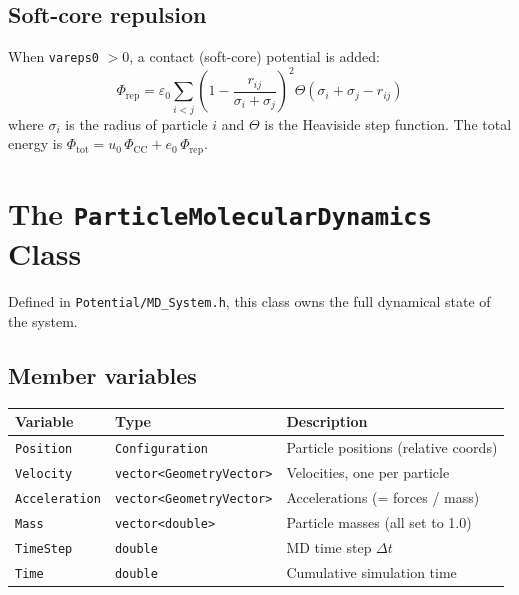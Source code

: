 \documentclass[12pt,a4paper]{article}
\begin{document}
\subsection{Soft-core repulsion}

When \texttt{vareps0} $> 0$, a contact (soft-core) potential is added:
\begin{equation}
    \Phi_\text{rep} = \varepsilon_0 \sum_{i<j}
    \left(1 - \frac{r_{ij}}{\sigma_i + \sigma_j}\right)^2
    \Theta(\sigma_i + \sigma_j - r_{ij})
\end{equation}
where $\sigma_i$ is the radius of particle $i$ and $\Theta$ is the
Heaviside step function.
The total energy is $\Phi_\text{tot} = u_0\,\Phi_\text{CC} + e_0\,\Phi_\text{rep}$.

\section{The \texttt{ParticleMolecularDynamics} Class}

Defined in \texttt{Potential/MD\_System.h}, this class owns the full
dynamical state of the system.

\subsection{Member variables}

\begin{center}
\begin{tabular}{lll}
\toprule
Variable & Type & Description \\
\midrule
\texttt{Position} & \texttt{Configuration} & Particle positions (relative coords) \\
\texttt{Velocity} & \texttt{vector<GeometryVector>} & Velocities, one per particle \\
\texttt{Acceleration} & \texttt{vector<GeometryVector>} & Accelerations (= forces / mass) \\
\texttt{Mass} & \texttt{vector<double>} & Particle masses (all set to 1.0) \\
\texttt{TimeStep} & \texttt{double} & MD time step $\Delta t$ \\
\texttt{Time} & \texttt{double} & Cumulative simulation time \\
\bottomrule
\end{tabular}
\end{center}
\end{document}
